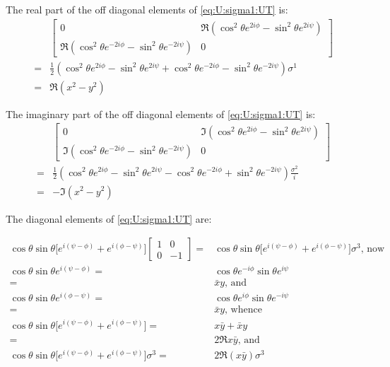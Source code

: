 \documentclass[]{article}
\begin{document}
The real part of the off diagonal elements of \eqref{eq:U:sigma1:UT} is:
\begin{align*}
	&\begin{bmatrix}
		0&\Re(\cos^2\theta e^{2i\phi}-\sin^2\theta e^{2i\psi}) \\
		\Re(\cos^2\theta e^{-2i\phi}-\sin^2\theta e^{-2i\psi})&0
	\end{bmatrix}\\
	=& \frac{1}{2}(\cos^2\theta e^{2i\phi}-\sin^2\theta e^{2i\psi}+ \cos^2\theta e^{-2i\phi}-\sin^2\theta e^{-2i\psi}) \sigma^1	\\
	=& \Re(x^2-y^2)	
\end{align*}

The imaginary part of the off diagonal elements of \eqref{eq:U:sigma1:UT} is:
\begin{align*}
	&\begin{bmatrix}
		0&\Im(\cos^2\theta e^{2i\phi}-\sin^2\theta e^{2i\psi}) \\
		\Im(\cos^2\theta e^{-2i\phi}-\sin^2\theta e^{-2i\psi})&0
	\end{bmatrix}\\
	=& \frac{1}{2}(\cos^2\theta e^{2i\phi}-\sin^2\theta e^{2i\psi}- \cos^2\theta e^{-2i\phi}+\sin^2\theta e^{-2i\psi}) \frac{\sigma^2}{i}	\\
	=& -\Im(x^2-y^2)	
\end{align*}

The diagonal elements of \eqref{eq:U:sigma1:UT} are:

\begin{align*}
	 \cos\theta \sin\theta\big[e^{i(\psi-\phi)}+e^{i(\phi-\psi)}\big]\begin{bmatrix}
		1&0\\
		0&-1
	\end{bmatrix}
	=& \cos\theta \sin\theta\big[e^{i(\psi-\phi)}+e^{i(\phi-\psi)}\big] \sigma^3 \text{, now}\\
	\cos\theta \sin\theta e^{i(\psi-\phi)}=& \cos\theta e^{-i\phi} \sin\theta e^{i\psi}\\
	=& \bar{x} y \text{, and}\\
	\cos\theta \sin\theta e^{i(\phi-\psi)}=& \cos\theta e^{i\phi} \sin\theta e^{-i\psi}\\
	=& \bar{x} y \text{, whence} \\
	\cos\theta \sin\theta\big[e^{i(\psi-\phi)}+e^{i(\phi-\psi)}\big] =& x\bar{y} + \bar{x}y\\
	=&2 \Re{x\bar{y}} \text{, and}\\
	\cos\theta \sin\theta\big[e^{i(\psi-\phi)}+e^{i(\phi-\psi)}\big] \sigma^3 =& 2 \Re({x\bar{y}}) \sigma^3 
\end{align*}
\end{document}
